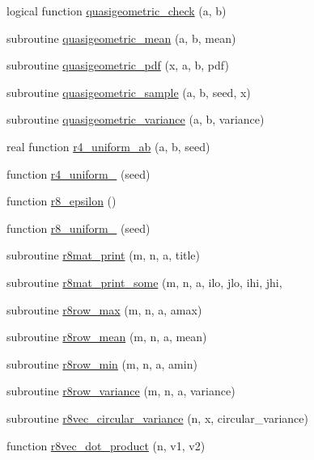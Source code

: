 \begin{DoxyCompactItemize}
\item 
logical function \hyperlink{subroutines_8f_a96bb9b2b221ea79c95939f9dbe18e9ea}{quasigeometric\+\_\+check} (a, b)
\item 
subroutine \hyperlink{subroutines_8f_a418662fcf5cf28009331bdcfec409cdf}{quasigeometric\+\_\+mean} (a, b, mean)
\item 
subroutine \hyperlink{subroutines_8f_a57411de0fdc63ca7e4e22123a96481fa}{quasigeometric\+\_\+pdf} (x, a, b, pdf)
\item 
subroutine \hyperlink{subroutines_8f_a1256bc0c59e7792531846e68107508c0}{quasigeometric\+\_\+sample} (a, b, seed, x)
\item 
subroutine \hyperlink{subroutines_8f_a8a8ee18a7af38d1039a568f9addd8f82}{quasigeometric\+\_\+variance} (a, b, variance)
\item 
real function \hyperlink{subroutines_8f_ae3ff5bb6289eaf322c0388b7b4bef196}{r4\+\_\+uniform\+\_\+ab} (a, b, seed)
\item 
function \hyperlink{subroutines_8f_ad22a9ea3f2620ff201ba0eeec82e0ae6}{r4\+\_\+uniform\+\_} (seed)
\item 
function \hyperlink{subroutines_8f_ac9af998845bffd8c6eed4d4cf52d9c08}{r8\+\_\+epsilon} ()
\item 
function \hyperlink{subroutines_8f_adda13d639fe87cc3f3c9875a30c8276c}{r8\+\_\+uniform\+\_} (seed)
\item 
subroutine \hyperlink{subroutines_8f_acd023da27fb88ef28004cf11f5942d05}{r8mat\+\_\+print} (m, n, a, title)
\item 
subroutine \hyperlink{subroutines_8f_a432586d1ce42c3c748dc0659c9626c86}{r8mat\+\_\+print\+\_\+some} (m, n, a, ilo, jlo, ihi, jhi,
\item 
subroutine \hyperlink{subroutines_8f_a704f15e9fc2805ec7c3daf97bb353f1c}{r8row\+\_\+max} (m, n, a, amax)
\item 
subroutine \hyperlink{subroutines_8f_a0d5ecf067cee9f1578dbce581a7eccf4}{r8row\+\_\+mean} (m, n, a, mean)
\item 
subroutine \hyperlink{subroutines_8f_a7c1325ae8ea9f6aa9109e208712afcd1}{r8row\+\_\+min} (m, n, a, amin)
\item 
subroutine \hyperlink{subroutines_8f_a3a87c9f6e18e8c777449225e06a1124e}{r8row\+\_\+variance} (m, n, a, variance)
\item 
subroutine \hyperlink{subroutines_8f_a6f5548af22c5933a7360db1eefaa985e}{r8vec\+\_\+circular\+\_\+variance} (n, x, circular\+\_\+variance)
\item 
function \hyperlink{subroutines_8f_a53818831efeb1c9cea9cda383bdfebf1}{r8vec\+\_\+dot\+\_\+product} (n, v1, v2)

\end{DoxyCompactItemize}
